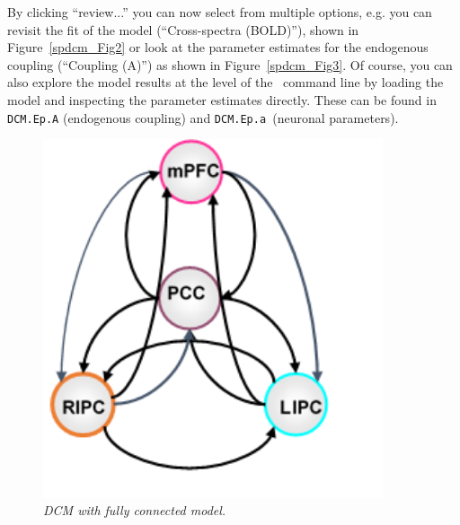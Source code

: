 By clicking ``review...'' you can now select from multiple options, e.g. you can revisit the fit of the model (``Cross-spectra (BOLD)''), shown in Figure~\ref{spdcm_Fig2} or look at the parameter estimates for the endogenous coupling (``Coupling (A)'') as shown in Figure~\ref{spdcm_Fig3}. Of course, you can also explore the model results at the level of the \matlab\ command line by loading the model and inspecting the parameter estimates directly. These can be found in \texttt{DCM.Ep.A} (endogenous coupling) and  \texttt{DCM.Ep.a }(neuronal parameters).

\begin{figure}[ht]
\begin{center}
\includegraphics[width=100mm]{dcm_rs/dcm_mod_full}
\caption{\em DCM with fully connected model.\label{spdcm_full}}
\end{center}
\end{figure}



